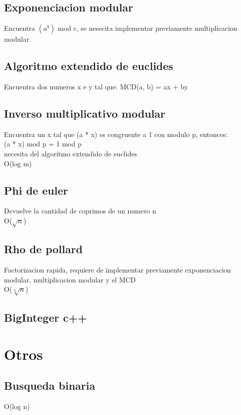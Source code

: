 \documentclass[10pt,landscape,twocolumn,a4paper,notitlepage]{article}
\newcommand\cppfile[2][]{

}
\begin{document}
			\subsection{Exponenciacion modular}
			Encuentra $(a^b)$ mod c, se nesecita implementar previamente multiplicacion modular.
			\cppfile[16-20]{matematicas/exp_modular.cpp}
			\subsection{Algoritmo extendido de euclides}
			Encuentra dos numeros x e y tal que: MCD(a, b) = ax + by
			\cppfile[5-24]{matematicas/algoritmo_extendido_de_euclides.cpp}
			\subsection{Inverso multiplicativo modular}
			Encuentra un x tal que (a * x) es congruente a 1 con modulo p,
				entonces:\\ (a * x) mod p = 1 mod p\\
				necesita del algoritmo extendido de euclides\\
			O(log m)
			\cppfile[17-27]{matematicas/inverso_multiplicativo_modular.cpp}
			\subsection{Phi de euler}
			Devuelve la cantidad de coprimos de un numero n\\
			O($\sqrt{n}$)
			\cppfile[5-16]{matematicas/phi_de_euler.cpp}
			\subsection{Rho de pollard}
			Factorizacion rapida, requiere de implementar previamente exponenciacion modular,
				multiplicacion modular y el MCD\\
			O($\sqrt[4]{n}$)
			\cppfile[26-89]{matematicas/rho_de_pollard.cpp}
			\subsection{BigInteger c++}
			\cppfile[1-161]{matematicas/biginteger.cpp}
		
		\section{Otros}
			\subsection{Busqueda binaria}
			O(log n)
			\cppfile[7-22]{otros/busqueda_binaria.cpp}
\end{document}
